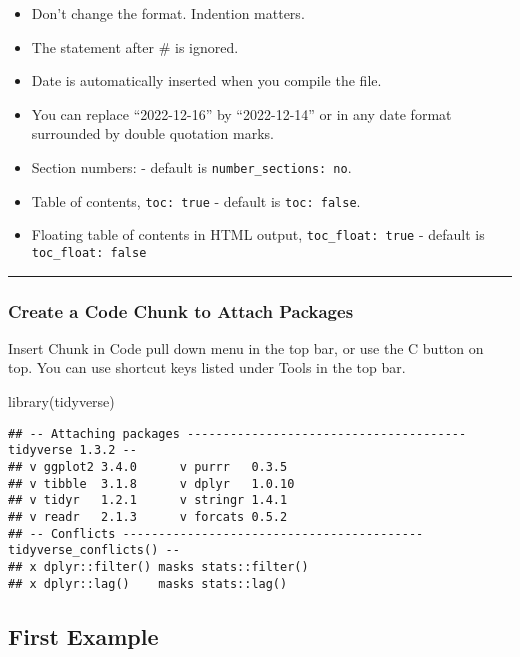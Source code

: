 \documentclass[
]{article}
\newenvironment{Shaded}{\begin{snugshade}}{\end{snugshade}}
\newcommand{\FunctionTok}[1]{\textcolor[rgb]{0.00,0.00,0.00}{#1}}
\newcommand{\NormalTok}[1]{#1}
\providecommand{\tightlist}{%
  \setlength{\itemsep}{0pt}\setlength{\parskip}{0pt}}
\begin{document}
\begin{itemize}
\tightlist
\item
  Don't change the format. Indention matters.
\item
  The statement after \# is ignored.
\item
  Date is automatically inserted when you compile the file.
\item
  You can replace ``2022-12-16'' by ``2022-12-14'' or in any date format
  surrounded by double quotation marks.
\item
  Section numbers: - default is \texttt{number\_sections:\ no}.
\item
  Table of contents, \texttt{toc:\ true} - default is
  \texttt{toc:\ false}.
\item
  Floating table of contents in HTML output, \texttt{toc\_float:\ true}
  - default is \texttt{toc\_float:\ false}
\end{itemize}

\begin{center}\rule{0.5\linewidth}{0.5pt}\end{center}

\hypertarget{create-a-code-chunk-to-attach-packages}{%
\subsubsection{Create a Code Chunk to Attach
Packages}\label{create-a-code-chunk-to-attach-packages}}

Insert Chunk in Code pull down menu in the top bar, or use the C button
on top. You can use shortcut keys listed under Tools in the top bar.

\begin{Shaded}
\begin{Highlighting}[]
\FunctionTok{library}\NormalTok{(tidyverse)}
\end{Highlighting}
\end{Shaded}

\begin{verbatim}
## -- Attaching packages --------------------------------------- tidyverse 1.3.2 --
## v ggplot2 3.4.0      v purrr   0.3.5 
## v tibble  3.1.8      v dplyr   1.0.10
## v tidyr   1.2.1      v stringr 1.4.1 
## v readr   2.1.3      v forcats 0.5.2 
## -- Conflicts ------------------------------------------ tidyverse_conflicts() --
## x dplyr::filter() masks stats::filter()
## x dplyr::lag()    masks stats::lag()
\end{verbatim}

\hypertarget{first-example}{%
\subsection{First Example}\label{first-example}}
\end{document}
